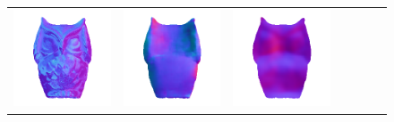 \begin{figure}
\begin{tabular*}{\linewidth}{@{}c@{}c@{}c@{}c@{}c@{}c@{}c@{}}
\includegraphics[width=\reswidth\linewidth]{figures/results/examples/dpsn_owlie_normals.png} &
\includegraphics[width=\reswidth\linewidth]{figures/results/examples/marrnet_owlie_normals.png} &
\includegraphics[width=\reswidth\linewidth]{figures/results/examples/ef_owlie_normals.png} \\


\end{tabular*}
\end{figure}
